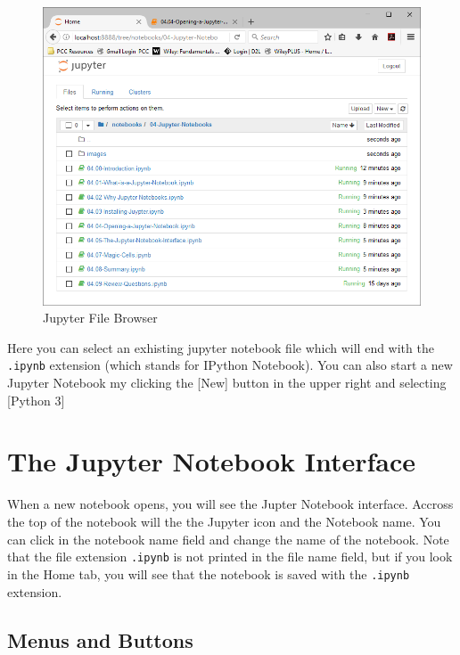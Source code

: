 \documentclass{book}
\makeatletter
\def\maxwidth{\ifdim\Gin@nat@width>\linewidth\linewidth
    \else\Gin@nat@width\fi}
\let\Oldincludegraphics\includegraphics
\renewcommand{\includegraphics}[1]{\Oldincludegraphics[width=.8\maxwidth]{#1}}
\makeatother
\begin{document}
\begin{figure}
\centering
\includegraphics{images/Jupyter_Home_Browser.png}
\caption{Jupyter File Browser}
\end{figure}

Here you can select an exhisting jupyter notebook file which will end
with the \lstinline!.ipynb! extension (which stands for IPython
Notebook). You can also start a new Jupyter Notebook my clicking the
{[}New{]} button in the upper right and selecting {[}Python 3{]}
    




    
        \section{The Jupyter Notebook
Interface}\label{the-jupyter-notebook-interface}

When a new notebook opens, you will see the Jupter Notebook interface.
Accross the top of the notebook will the the Jupyter icon and the
Notebook name. You can click in the notebook name field and change the
name of the notebook. Note that the file extension \lstinline!.ipynb! is
not printed in the file name field, but if you look in the Home tab, you
will see that the notebook is saved with the \lstinline!.ipynb!
extension.
    




    
        \subsection{Menus and Buttons}\label{menus-and-buttons}
\end{document}
